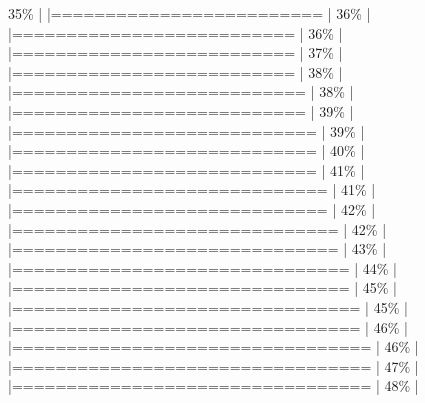 \documentclass[
]{article}
\newenvironment{Shaded}{}{}
\begin{document}
\begin{Shaded}
\begin{Highlighting}[]
35\%  |                                                                              |=========================                                             |  36\%  |                                                                              |==========================                                            |  36\%  |                                                                              |==========================                                            |  37\%  |                                                                              |==========================                                            |  38\%  |                                                                              |===========================                                           |  38\%  |                                                                              |===========================                                           |  39\%  |                                                                              |============================                                          |  39\%  |                                                                              |============================                                          |  40\%  |                                                                              |============================                                          |  41\%  |                                                                              |=============================                                         |  41\%  |                                                                              |=============================                                         |  42\%  |                                                                              |==============================                                        |  42\%  |                                                                              |==============================                                        |  43\%  |                                                                              |===============================                                       |  44\%  |                                                                              |===============================                                       |  45\%  |                                                                              |================================                                      |  45\%  |                                                                              |================================                                      |  46\%  |                                                                              |=================================                                     |  46\%  |                                                                              |=================================                                     |  47\%  |                                                                              |=================================                                     |  48\%  |                                                                              
\end{Highlighting}
\end{Shaded}
\end{document}
